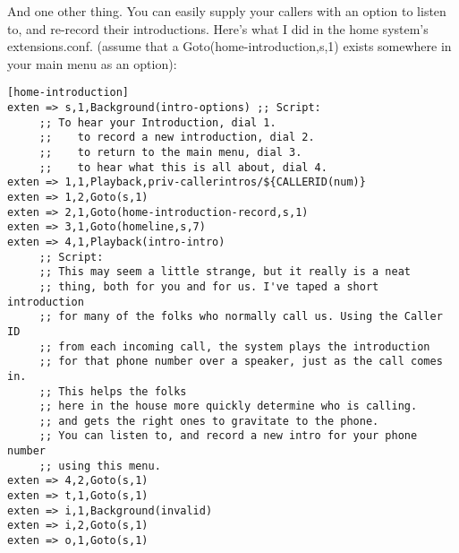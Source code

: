 And one other thing. You can easily supply your callers with an option
to listen to, and re-record their introductions. Here's what I did in
the home system's extensions.conf. (assume that a
Goto(home-introduction,s,1) exists somewhere in your main menu as an
option):

\begin{astlisting}
\begin{verbatim}
[home-introduction]
exten => s,1,Background(intro-options) ;; Script:
     ;; To hear your Introduction, dial 1.
     ;;    to record a new introduction, dial 2.
     ;;    to return to the main menu, dial 3.
     ;;    to hear what this is all about, dial 4.
exten => 1,1,Playback,priv-callerintros/${CALLERID(num)}
exten => 1,2,Goto(s,1)
exten => 2,1,Goto(home-introduction-record,s,1)
exten => 3,1,Goto(homeline,s,7)
exten => 4,1,Playback(intro-intro)
     ;; Script:
     ;; This may seem a little strange, but it really is a neat
     ;; thing, both for you and for us. I've taped a short introduction
     ;; for many of the folks who normally call us. Using the Caller ID
     ;; from each incoming call, the system plays the introduction
     ;; for that phone number over a speaker, just as the call comes in.
     ;; This helps the folks
     ;; here in the house more quickly determine who is calling.
     ;; and gets the right ones to gravitate to the phone.
     ;; You can listen to, and record a new intro for your phone number
     ;; using this menu.
exten => 4,2,Goto(s,1)
exten => t,1,Goto(s,1)
exten => i,1,Background(invalid)
exten => i,2,Goto(s,1)
exten => o,1,Goto(s,1)


\end{verbatim}
\end{astlisting}
